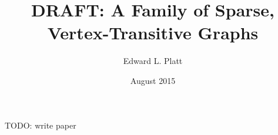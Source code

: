 \documentclass{article}
\title{DRAFT: A Family of Sparse, Vertex-Transitive Graphs}
\author{Edward L. Platt}
\date{August 2015}
\begin{document}
\maketitle

TODO: write paper



\end{document}

